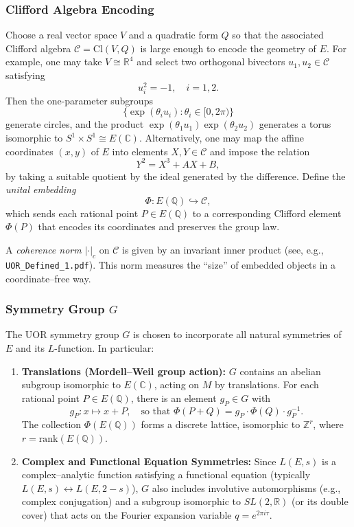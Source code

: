 \documentclass[11pt]{article}
\begin{document}
\subsubsection*{Clifford Algebra Encoding}
Choose a real vector space $V$ and a quadratic form $Q$ so that the associated Clifford algebra $\mathcal{C} = \mathrm{Cl}(V,Q)$ is large enough to encode the geometry of $E$. For example, one may take $V \cong \mathbb{R}^4$ and select two orthogonal bivectors $u_1,u_2 \in \mathcal{C}$ satisfying 
\[
u_i^2 = -1,\quad i=1,2.
\]
Then the one-parameter subgroups 
\[
\{\exp(\theta_i u_i) : \theta_i\in [0,2\pi)\}
\]
generate circles, and the product $\exp(\theta_1 u_1)\exp(\theta_2 u_2)$ generates a torus isomorphic to $S^1\times S^1\cong E(\mathbb{C})$. Alternatively, one may map the affine coordinates $(x,y)$ of $E$ into elements $X,Y\in\mathcal{C}$ and impose the relation 
\[
Y^2 = X^3 + AX + B,
\]
by taking a suitable quotient by the ideal generated by the difference. Define the \emph{unital embedding} 
\[
\Phi: E(\mathbb{Q}) \hookrightarrow \mathcal{C},
\]
which sends each rational point $P\in E(\mathbb{Q})$ to a corresponding Clifford element $\Phi(P)$ that encodes its coordinates and preserves the group law.

A \emph{coherence norm} $|\cdot|_c$ on $\mathcal{C}$ is given by an invariant inner product (see, e.g., \texttt{UOR\_Defined\_1.pdf}). This norm measures the ``size'' of embedded objects in a coordinate--free way.

\subsubsection*{Symmetry Group $G$}
The UOR symmetry group $G$ is chosen to incorporate all natural symmetries of $E$ and its $L$-function. In particular:
\begin{enumerate}[label=(\roman*)]
  \item \textbf{Translations (Mordell--Weil group action):} $G$ contains an abelian subgroup isomorphic to $E(\mathbb{C})$, acting on $M$ by translations. For each rational point $P\in E(\mathbb{Q})$, there is an element $g_P\in G$ with
  \[
  g_P: x \mapsto x+P, \quad \text{so that } \Phi(P+Q)=g_P\cdot \Phi(Q)\cdot g_P^{-1}.
  \]
  The collection $\Phi(E(\mathbb{Q}))$ forms a discrete lattice, isomorphic to $\mathbb{Z}^r$, where $r=\mathrm{rank}(E(\mathbb{Q}))$.
  
  \item \textbf{Complex and Functional Equation Symmetries:} Since $L(E,s)$ is a complex--analytic function satisfying a functional equation (typically $L(E,s) \leftrightarrow L(E,2-s)$), $G$ also includes involutive automorphisms (e.g., complex conjugation) and a subgroup isomorphic to $SL(2,\mathbb{R})$ (or its double cover) that acts on the Fourier expansion variable $q=e^{2\pi i \tau}$.
\end{enumerate}
\end{document}
